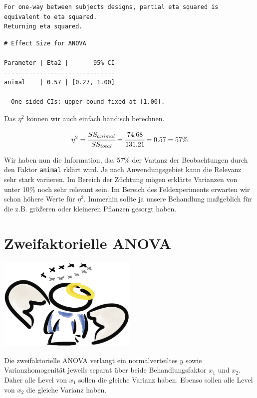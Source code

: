 \documentclass[
  letterpaper,
]{scrbook}
\begin{document}
\begin{verbatim}
For one-way between subjects designs, partial eta squared is equivalent to eta squared.
Returning eta squared.
\end{verbatim}

\begin{verbatim}
# Effect Size for ANOVA

Parameter | Eta2 |       95% CI
-------------------------------
animal    | 0.57 | [0.27, 1.00]

- One-sided CIs: upper bound fixed at [1.00].
\end{verbatim}

Das \(\eta^2\) können wir auch einfach händisch berechnen.

\[
\eta^2 = \cfrac{SS_{animal}}{SS_{total}} = \cfrac{74.68}{131.21} = 0.57 = 57\%
\]

Wir haben nun die Information, das 57\% der Varianz der Beobachtungen
durch den Faktor \texttt{animal} rklärt wird. Je nach Anwendungsgebiet
kann die Relevanz sehr stark variieren. Im Bereich der Züchtung mögen
erklärte Varianzen von unter 10\% noch sehr relevant sein. Im Bereich
des Feldexperiments erwarten wir schon höhere Werte für \(\eta^2\).
Immerhin sollte ja unsere Behandlung maßgeblich für die z.B. größeren
oder kleineren Pflanzen gesorgt haben.

\hypertarget{sec-fac2}{%
\section{Zweifaktorielle ANOVA}\label{sec-fac2}}

\begin{marginfigure}

{\centering \includegraphics[width=0.5\textwidth,height=\textheight]{./images/angel_01.png}

}

\end{marginfigure}

Die zweifaktorielle ANOVA verlangt ein normalverteiltes \(y\) sowie
Varianzhomogenität jeweils separat über beide Behandlungsfaktor \(x_1\)
und \(x_2\). Daher alle Level von \(x_1\) sollen die gleiche Varianz
haben. Ebenso sollen alle Level von \(x_2\) die gleiche Varianz haben.
\end{document}
